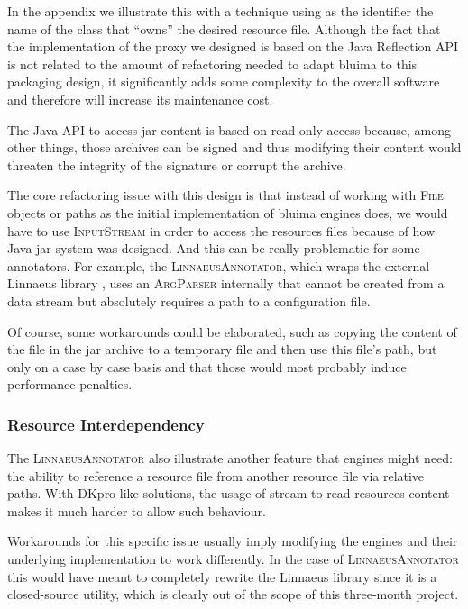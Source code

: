 \documentclass{article}
\newcommand{\ID}[1]{{\textsc{#1}}}
\begin{document}
In the appendix we illustrate this with a technique using as the identifier the name of the class
that ``owns'' the desired resource file. Although the fact that the implementation of the proxy we
designed is based on the Java Reflection API is not related to the amount of refactoring needed to
adapt bluima to this packaging design, it significantly adds some complexity to the overall software
and therefore will increase its maintenance cost.

The Java API to access jar content is based on read-only access because, among other things, those
archives can be signed and thus modifying their content would threaten the integrity of the
signature or corrupt the archive.

The core refactoring issue with this design is that instead of working with \ID{File} objects or
paths as the initial implementation of bluima engines does, we would have to use \ID{InputStream} in
order to access the resources files because of how Java jar system was designed. And this can be
really problematic for some annotators. For example, the \ID{LinnaeusAnnotator}, which wraps the
external Linnaeus library \cite{linnaeus}, uses an \ID{ArgParser} internally that cannot be created
from a data stream but absolutely requires a path to a configuration file.

Of course, some workarounds could be elaborated, such as copying the content of the file in the jar
archive to a temporary file and then use this file's path, but only on a case by case basis and that
those would most probably induce performance penalties.

\subsubsection{Resource Interdependency}

The \ID{LinnaeusAnnotator} also illustrate another feature that engines might need: the ability to
reference a resource file from another resource file via relative paths. With DKpro-like solutions,
the usage of stream to read resources content makes it much harder to allow such behaviour.

Workarounds for this specific issue usually imply modifying the engines and their underlying
implementation to work differently. In the case of \ID{Linnaeus\-Annotator} this would have meant to
completely rewrite the Linnaeus library since it is a closed-source utility, which is clearly out of
the scope of this three-month project.
\end{document}
